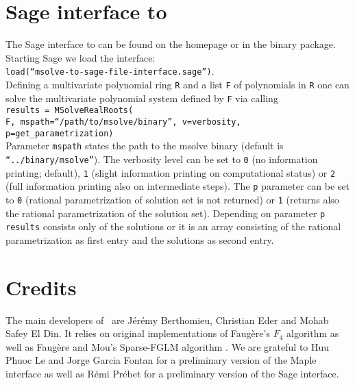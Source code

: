 \documentclass[a4paper,english,11pt]{scrartcl}
\theoremstyle{definition}
\theoremstyle{remark}
\begin{document}
\section{Sage interface to \msolve}
The Sage interface to \msolve can be found on the \msolve homepage or in the
\msolve binary package. Starting
Sage we load the interface:\\[1em]
\texttt{load(“msolve-to-sage-file-interface.sage”)}.\\[1em]
Defining a multivariate polynomial ring \texttt{R} and a list \texttt{F} of
polynomials in \texttt{R} one can solve the multivariate polynomial system
defined by \texttt{F} via calling\\[1em]
\texttt{results = MSolveRealRoots(}\\
\texttt{F, mspath=“/path/to/msolve/binary”,
v=verbosity, p=get\_parametrization)}\\[1em]
Parameter \texttt{mspath} states the path to the msolve binary (default is
\texttt{“../binary/msolve”}).
The verbosity level can be set to \texttt{0} (no information printing; default),
\texttt{1} (slight information printing on computational status) or \texttt{2}
(full information printing also on intermediate steps).
The \texttt{p} parameter can be set to \texttt{0} (rational parametrization of
solution set is not returned) or \texttt{1} (returns also the rational
parametrization of the solution set). Depending on parameter \texttt{p}
\texttt{results} consists only of the solutions or it is an array consisting of
the rational parametrization as first entry and the solutions as second entry.
\section{Credits}

The main developers of \msolve~are J\'er\'emy Berthomieu, Christian Eder and
Mohab Safey El Din. It relies on original implementations of Faug\`ere's $F_4$
algorithm \cite{F4} as well as Faug\`ere and Mou's Sparse-FGLM algorithm
\cite{SparseFGLM}. We are grateful to Huu Phuoc Le and Jorge Garcia Fontan for a
preliminary version of the Maple interface as well as Rémi Prébet for a
preliminary version of the Sage interface.  

\renewcommand*{\bibfont}{\small}
  \printbibliography
\end{document}
